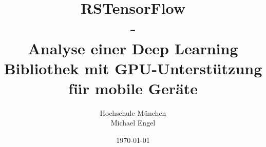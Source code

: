 \documentclass{IEEEtran}
\title{RSTensorFlow\\ - \\Analyse einer Deep Learning Bibliothek mit GPU-Unterstützung für mobile Geräte}
\author{Hochschule München \\ Michael Engel}
\date{\today}
\begin{document}
\maketitle











{}
\end{document}
